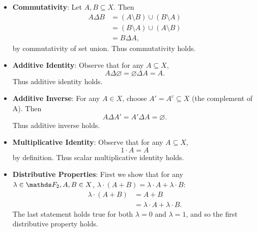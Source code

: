 \documentclass{homework}
\begin{document}
\begin{solution}
\begin{itemize}
    \item \textbf{Commutativity}: Let $A,B\subseteq X$. Then 
      \begin{align*}
        A\Delta B &= \left( A\setminus B \right) \cup \left( B\setminus A \right) \\
                  &= \left( B\setminus A \right) \cup \left( A\setminus B \right)  \\
                  &= B\Delta A
      ,\end{align*} by commutativity of set union. Thus commutativity holds.

    \item \textbf{Additive Identity}: Observe that for any $A\subseteq X$, \[
      A\Delta \varnothing=\varnothing\Delta A = A
      .\] Thus additive identity holds.
      
    \item \textbf{Additive Inverse}: For any $A\in X$, choose $A'=A^{c}\subseteq X$ (the complement
      of A). Then \[
        A\Delta A' = A' \Delta A = \varnothing
      .\] Thus additive inverse holds.

    \item \textbf{Multiplicative Identity}: Observe that for any $A\subseteq X$, \[
      1\cdot A=A
    \] by definition. Thus scalar multiplicative identity holds.

  \item \textbf{Distributive Properties}: First we show that for any $\lambda\in \F_2, A,B \in X$,
    $ \lambda\cdot (A+B)=\lambda\cdot A+\lambda\cdot B$:
    \begin{align*}
      \lambda\cdot \left( A+B \right) &= A+B \\
      &= \lambda\cdot A+\lambda\cdot B
    .\end{align*} The last statement holds true for both $\lambda=0$ and $\lambda=1$, and so the
    first distributive property holds.\\


\end{itemize}
\end{solution}
\end{document}
